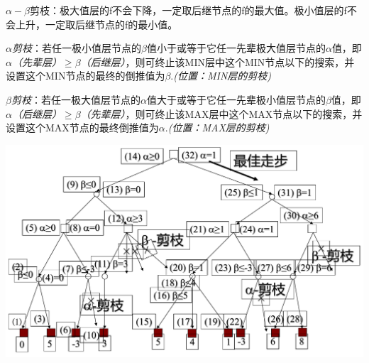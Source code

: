 \documentclass[twocolumn,zihao=5,linespread=1,heading=false,autoindent=0pt]{ctexart}
\theoremstyle{exampstyle} \newtheorem{definition}{定义}[section]
\theoremstyle{exampstyle} \newtheorem{example}{例}[section]
\theoremstyle{exampstyle} \newtheorem{theorem}{定理}[section]
\theoremstyle{exampstyle} \newtheorem{lemma}{引理}[section]
\theoremstyle{exampstyle} \newtheorem{myproof}{证明}[section]
\begin{document}
$\alpha-\beta$剪枝：极大值层的f不会下降，一定取后继节点的f的最大值。极小值层的f不会上升，一定取后继节点的f的最小值。

\emph{$\alpha$剪枝}：若任一极小值层节点的$\beta$值小于或等于它任一先辈极大值层节点的$\alpha$值，即 \emph{$\alpha$（先辈层）$\ge \beta$（后继层）}，则可终止该MIN层中这个MIN节点以下的搜索，并设置这个MIN节点的最终的倒推值为$\beta$.\emph{(位置：MIN层的剪枝)}

\emph{$\beta$剪枝}：若任一极大值层节点的$\alpha$值大于或等于它任一先辈极小值层节点的$\beta$值，即 \emph{$\alpha$（后继层）$\ge \beta$（先辈层）}，则可终止该MAX层中这个MAX节点以下的搜索，并设置这个MAX节点的最终倒推值为$\alpha$.\emph{(位置：MAX层的剪枝)}

\includegraphics[width=\linewidth]{alpha-beta.pdf}
\end{document}
